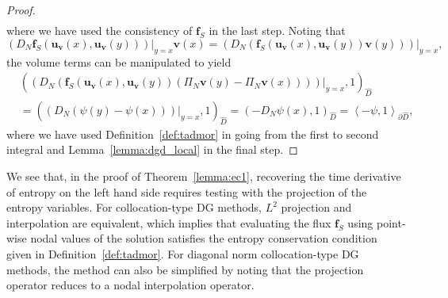 \documentclass[preprint,10pt]{article}
\theoremstyle{definition}
\theoremstyle{lemma}
\theoremstyle{theorem}
\theoremstyle{assumption}
\newcommand{\LRp}[1]{\left( #1 \right)}
\newcommand{\LRa}[1]{\left\langle #1 \right\rangle}
\begin{document}
\begin{proof}
\begin{align*}
\end{align*}
where we have used the consistency of $\bm{f}_S$ in the last step.  
Noting that 
\[
\left.\LRp{D_N \bm{f}_S(\bm{u}_{\bm{v}}(x),\bm{u}_{\bm{v}}(y))}\right|_{y=x}\bm{v}(x) = \left.\LRp{D_N \LRp{\bm{f}_S(\bm{u}_{\bm{v}}(x),\bm{u}_{\bm{v}}(y))\bm{v}(y)}}\right|_{y=x},
\]
the volume terms can be manipulated to yield
\begin{align*}
&\LRp{\left.\LRp{D_N \LRp{\bm{f}_S(\bm{u}_{\bm{v}}(x),\bm{u}_{\bm{v}}(y))\LRp{\Pi_N\bm{v}(y)-\Pi_N\bm{v}(x)} }}\right|_{y=x},1}_{\widehat{D}} \\
&= \LRp{ \left.\LRp{D_N\LRp{\psi(y)-\psi(x) }}\right|_{y=x},1}_{\widehat{D}} = \LRp{-D_N \psi(x),1}_{\widehat{D}} = \LRa{-\psi,1}_{\partial \widehat{D}},
\end{align*}
where we have used Definition~\ref{def:tadmor} in going from the first to second integral and Lemma~\ref{lemma:dgd_local} in the final step.  
%
\end{proof}

We see that, in the proof of Theorem~\ref{lemma:ec1}, recovering the time derivative of entropy on the left hand side requires testing with the projection of the entropy variables.  For collocation-type DG methods, $L^2$ projection and interpolation are equivalent, which implies that evaluating the flux $\bm{f}_S$ using point-wise nodal values of the solution satisfies the entropy conservation condition given in Definition~\ref{def:tadmor}.  For diagonal norm collocation-type DG methods, the method can also be simplified by noting that the projection operator reduces to a nodal interpolation operator.  
\end{document}
